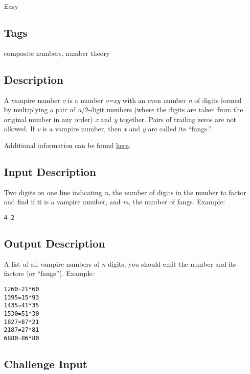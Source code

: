 Easy

\subsection{Tags}\label{tags-11}

composite numbers, number theory

\subsection{Description}\label{description-11}

A vampire number \emph{v} is a number \emph{v=xy} with an even number
\emph{n} of digits formed by multiplying a pair of \emph{n}/2-digit
numbers (where the digits are taken from the original number in any
order) \emph{x} and \emph{y} together. Pairs of trailing zeros are not
allowed. If \emph{v} is a vampire number, then \emph{x} and \emph{y} are
called its ``fangs.''

Additional information can be found
\href{http://www.primepuzzles.net/puzzles/puzz_199.htm}{here}.

\subsection{Input Description}\label{input-description-9}

Two digits on one line indicating \emph{n}, the number of digits in the
number to factor and find if it is a vampire number, and \emph{m}, the
number of fangs. Example:

\begin{verbatim}
4 2
\end{verbatim}

\subsection{Output Description}\label{output-description-9}

A list of all vampire numbers of \emph{n} digits, you should emit the
number and its factors (or ``fangs''). Example:

\begin{verbatim}
1260=21*60
1395=15*93
1435=41*35
1530=51*30
1827=87*21
2187=27*81
6880=86*80
\end{verbatim}

\subsection{Challenge Input}\label{challenge-input-8}

